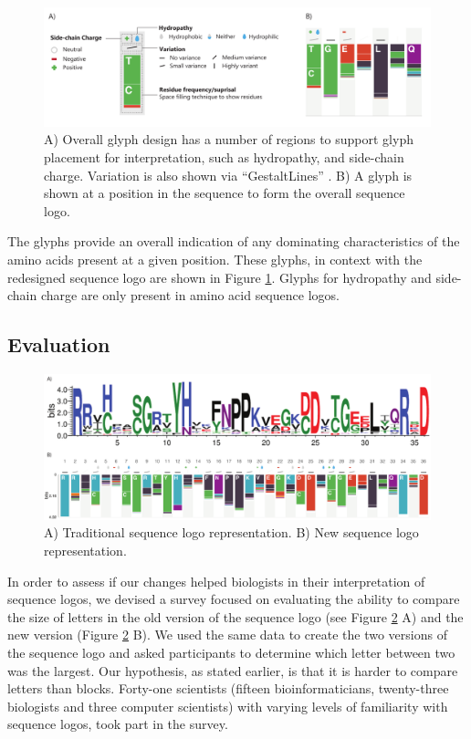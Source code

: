 \begin{figure}[t!]
\centering
\includegraphics[width=\textwidth]{images/other_glyphs/sequence_logo/glyphs}
\caption{A) Overall glyph design has a number of regions to support glyph placement for interpretation, such as hydropathy, and side-chain charge.
Variation is also shown via ``GestaltLines'' \cite{brandes2013gestaltlines}.
B) A glyph is shown at a position in the sequence to form the overall sequence logo.}
\label{fig:glyphs}
\end{figure}

The glyphs provide an overall indication of any dominating characteristics of the amino acids present at a given position.
These glyphs, in context with the redesigned sequence logo are shown in Figure \ref{fig:glyphs}.
Glyphs for hydropathy and side-chain charge are only present in amino acid sequence logos. 


\subsection{Evaluation}

\begin{figure}[b!]
\centering
\includegraphics[width=\textwidth]{images/other_glyphs/sequence_logo/old_and_new_design}
\caption{A) Traditional sequence logo representation. B) New sequence logo representation.}
\label{fig:old_and_new}
\end{figure}

In order to assess if our changes helped biologists in their interpretation of sequence logos, we devised a survey focused on evaluating the ability to compare the size of letters in the old version of the sequence logo (see Figure \ref{fig:old_and_new} A) and the new version (Figure \ref{fig:old_and_new} B). We used the same data to create the two versions of the sequence logo and asked participants to determine which letter between two was the largest.
Our hypothesis, as stated earlier, is that it is harder to compare letters than blocks. Forty-one scientists (fifteen bioinformaticians, twenty-three biologists and three computer scientists) with varying levels of familiarity with sequence logos, took part in the survey.

